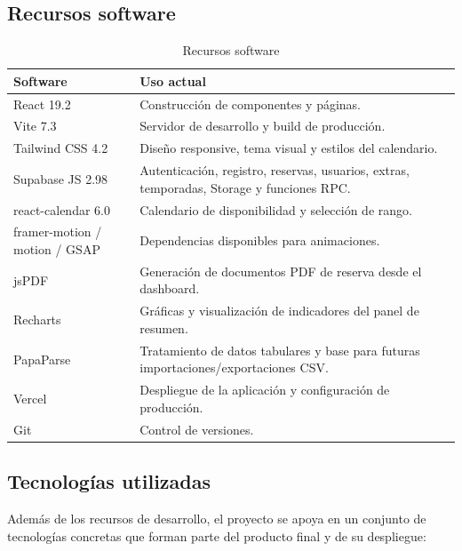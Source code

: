 \documentclass[11pt,a4paper]{article}
\begin{document}
\subsection{Recursos software}
\begin{table}[H]
\centering
\begin{tabularx}{\textwidth}{|p{4cm}|X|}
\hline
\textbf{Software} & \textbf{Uso actual} \\
\hline
React 19.2 & Construcción de componentes y páginas. \\
\hline
Vite 7.3 & Servidor de desarrollo y build de producción. \\
\hline
Tailwind CSS 4.2 & Diseño responsive, tema visual y estilos del calendario. \\
\hline
Supabase JS 2.98 & Autenticación, registro, reservas, usuarios, extras, temporadas, Storage y funciones RPC. \\
\hline
react-calendar 6.0 & Calendario de disponibilidad y selección de rango. \\
\hline
framer-motion / motion / GSAP & Dependencias disponibles para animaciones. \\
\hline
jsPDF & Generación de documentos PDF de reserva desde el dashboard. \\
\hline
Recharts & Gráficas y visualización de indicadores del panel de resumen. \\
\hline
PapaParse & Tratamiento de datos tabulares y base para futuras importaciones/exportaciones CSV. \\
\hline
Vercel & Despliegue de la aplicación y configuración de producción. \\
\hline
Git & Control de versiones. \\
\hline
\end{tabularx}
\caption{Recursos software}
\end{table}

\subsection{Tecnologías utilizadas}
Además de los recursos de desarrollo, el proyecto se apoya en un conjunto de tecnologías concretas que forman parte del producto final y de su despliegue:
\end{document}

